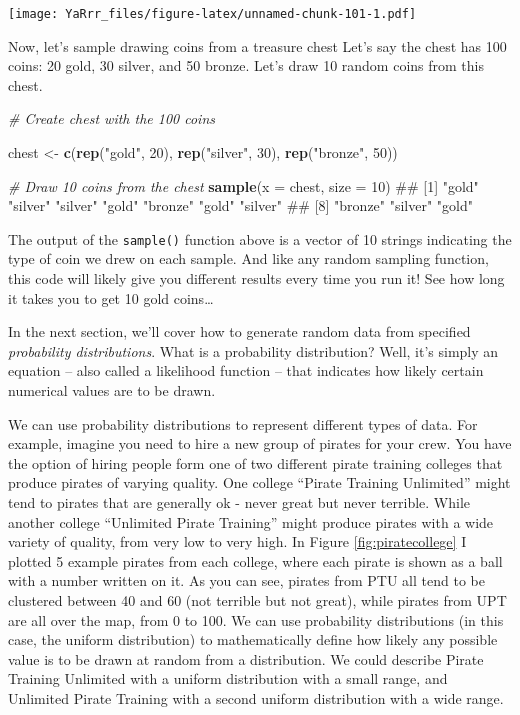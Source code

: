 \documentclass[]{book}
\newenvironment{Shaded}{\begin{snugshade}}{\end{snugshade}}
\newcommand{\KeywordTok}[1]{\textcolor[rgb]{0.13,0.29,0.53}{\textbf{{#1}}}}
\newcommand{\DataTypeTok}[1]{\textcolor[rgb]{0.13,0.29,0.53}{{#1}}}
\newcommand{\DecValTok}[1]{\textcolor[rgb]{0.00,0.00,0.81}{{#1}}}
\newcommand{\StringTok}[1]{\textcolor[rgb]{0.31,0.60,0.02}{{#1}}}
\newcommand{\CommentTok}[1]{\textcolor[rgb]{0.56,0.35,0.01}{\textit{{#1}}}}
\newcommand{\NormalTok}[1]{{#1}}
\theoremstyle{definition}
\theoremstyle{definition}
\theoremstyle{remark}
\begin{document}
\texttt{[image: YaRrr\_files/figure-latex/unnamed-chunk-101-1.pdf]}

Now, let's sample drawing coins from a treasure chest Let's say the
chest has 100 coins: 20 gold, 30 silver, and 50 bronze. Let's draw 10
random coins from this chest.

\begin{Shaded}
\begin{Highlighting}[]
\CommentTok{# Create chest with the 100 coins}

\NormalTok{chest <-}\StringTok{ }\KeywordTok{c}\NormalTok{(}\KeywordTok{rep}\NormalTok{(}\StringTok{"gold"}\NormalTok{, }\DecValTok{20}\NormalTok{),}
         \KeywordTok{rep}\NormalTok{(}\StringTok{"silver"}\NormalTok{, }\DecValTok{30}\NormalTok{),}
         \KeywordTok{rep}\NormalTok{(}\StringTok{"bronze"}\NormalTok{, }\DecValTok{50}\NormalTok{))}

\CommentTok{# Draw 10 coins from the chest}
\KeywordTok{sample}\NormalTok{(}\DataTypeTok{x =} \NormalTok{chest,}
       \DataTypeTok{size =} \DecValTok{10}\NormalTok{)}
\NormalTok{##  [1] "gold"   "silver" "silver" "gold"   "bronze" "gold"   "silver"}
\NormalTok{##  [8] "bronze" "silver" "gold"}
\end{Highlighting}
\end{Shaded}

The output of the \texttt{sample()} function above is a vector of 10
strings indicating the type of coin we drew on each sample. And like any
random sampling function, this code will likely give you different
results every time you run it! See how long it takes you to get 10 gold
coins\ldots{}

In the next section, we'll cover how to generate random data from
specified \emph{probability distributions}. What is a probability
distribution? Well, it's simply an equation -- also called a likelihood
function -- that indicates how likely certain numerical values are to be
drawn.

We can use probability distributions to represent different types of
data. For example, imagine you need to hire a new group of pirates for
your crew. You have the option of hiring people form one of two
different pirate training colleges that produce pirates of varying
quality. One college ``Pirate Training Unlimited'' might tend to pirates
that are generally ok - never great but never terrible. While another
college ``Unlimited Pirate Training'' might produce pirates with a wide
variety of quality, from very low to very high. In Figure
\ref{fig:piratecollege} I plotted 5 example pirates from each college,
where each pirate is shown as a ball with a number written on it. As you
can see, pirates from PTU all tend to be clustered between 40 and 60
(not terrible but not great), while pirates from UPT are all over the
map, from 0 to 100. We can use probability distributions (in this case,
the uniform distribution) to mathematically define how likely any
possible value is to be drawn at random from a distribution. We could
describe Pirate Training Unlimited with a uniform distribution with a
small range, and Unlimited Pirate Training with a second uniform
distribution with a wide range.
\end{document}

